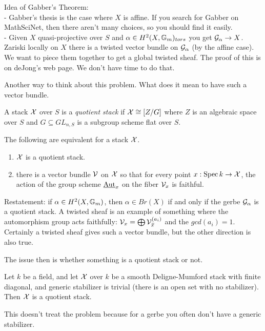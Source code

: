 Idea of Gabber's Theorem:\\
- Gabber's thesis is the case where $X$ is affine. If you search for
Gabber on MathSciNet, then there aren't many choices, so you should
find it easily.\\
- Given $X$ quasi-projective over $S$ and $\alpha\in
H^2(X,\mathbb{G}_m)_{tors}$ you get $\mathcal{G}_\alpha\to X$. Zariski locally on $X$
there is a twisted vector bundle on $\mathcal{G}_\alpha$ (by the affine case).
We want to piece them together to get a global twisted sheaf. The
proof of this is on deJong's web page. We don't have time to do that.

Another way to think about this problem. What does it mean to have
such a vector bundle.
\begin{definition}
  A stack $\mathcal{X}$ over $S$ is a \emph{quotient stack} if $\mathcal{X}\cong [Z/G]$
where $Z$ is an algebraic space over $S$ and $G\subseteq GL_{n,S}$ is
a subgroup scheme flat over $S$.
\end{definition}
\begin{proposition}
  The following are equivalent for a stack $\mathcal{X}$.
  \begin{enumerate}
   \item $\mathcal{X}$ is a quotient stack.
   \item there is a vector bundle $\mathcal{V}$ on $\mathcal{X}$ so that for every
point $x:\operatorname{Spec} k \to \mathcal{X}$, the action of the group scheme $\operatorname{\underline{Aut}}_x$ on
the fiber $\mathcal{V}_x$ is faithful.
  \end{enumerate}
\end{proposition}
Restatement: if $\alpha\in H^2(X,\mathbb{G}_m)$, then $\alpha\in Br(X)$ if
and only if the gerbe $\mathcal{G}_\alpha$ is a quotient stack. A twisted
sheaf is an example of something where the automorphism group acts
faithfully: $\V_x = \bigoplus \V_{\bbar x}^{(a_i)}$ and the
$gcd(a_i)=1$. Certainly a twisted sheaf gives such a vector bundle,
but the other direction is also true.

The issue then is whether something is a quotient stack or not.
\begin{theorem}
  Let $k$ be a field, and let $\mathcal{X}$ over $k$ be a smooth
Deligne-Mumford stack with finite diagonal, and generic stabilizer is
trivial (there is an open set with no stabilizer). Then $\mathcal{X}$ is a
quotient stack.
\end{theorem}
This doesn't treat the problem because for a gerbe you often don't
have a generic stabilizer.

